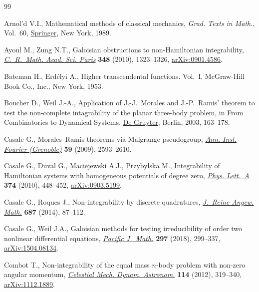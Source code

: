 \documentclass[pdftex]{sigma}
\numberwithin{equation}{section}
\begin{document}
\begin{thebibliography}{99}
\footnotesize\itemsep=0pt

Arnol'd V.I., Mathematical methods of classical mechanics, \textit{Grad. Texts
 in Math.}, Vol.~60, \href{https://doi.org/10.1007/978-1-4757-2063-1}{Springer}, New York, 1989.

Ayoul M., Zung N.T., Galoisian obstructions to non-{H}amiltonian integrability,
 \href{https://doi.org/10.1016/j.crma.2010.10.024}{\textit{C.~R.~Math. Acad. Sci. Paris}} \textbf{348} (2010), 1323--1326,
 \href{https://arxiv.org/abs/0901.4586}{arXiv:0901.4586}.

Bateman H., Erd\'elyi A., Higher transcendental functions. {V}ol.~{I},
 McGraw-Hill Book Co., Inc., New York, 1953.

Boucher D., Weil J.-A., Application of J.-J.~Morales and J.-P.~Ramis' theorem to
 test the non-complete intagrability of the planar three-body problem, in From
 Combinatorics to Dynamical Systems, \href{https://doi.org/10.1515/9783110200003.163}{De Gruyter}, Berlin, 2003, 163--178.

Casale G., {M}orales--{R}amis theorems via {M}algrange pseudogroup,
 \href{https://doi.org/10.5802/aif.2501}{\textit{Ann. Inst. Fourier (Grenoble)}} \textbf{59} (2009), 2593--2610.

Casale G., Duval G., Maciejewski A.J., Przybylska M., Integrability of
 {H}amiltonian systems with homogeneous potentials of degree zero,
 \href{https://doi.org/10.1016/j.physleta.2009.11.018}{\textit{Phys. Lett.~A}} \textbf{374} (2010), 448--452, \href{https://arxiv.org/abs/0903.5199}{arXiv:0903.5199}.

Casale G., Roques J., Non-integrability by discrete quadratures,
 \href{https://doi.org/10.1515/crelle-2012-0054}{\textit{J.~Reine Angew. Math.}} \textbf{687} (2014), 87--112.

Casale G., Weil J.A., Galoisian methods for testing irreducibility of order two
 nonlinear differential equations, \href{https://doi.org/10.2140/pjm.2018.297.299}{\textit{Pacific J.~Math.}} \textbf{297}
 (2018), 299--337, \href{https://arxiv.org/abs/1504.08134}{arXiv:1504.08134}.

Combot T., Non-integrability of the equal mass {$n$}-body problem with non-zero
 angular momentum, \href{https://doi.org/10.1007/s10569-012-9417-z}{\textit{Celestial Mech. Dynam. Astronom.}} \textbf{114}
 (2012), 319--340, \href{https://arxiv.org/abs/1112.1889}{arXiv:1112.1889}.


\end{thebibliography}
\end{document}
